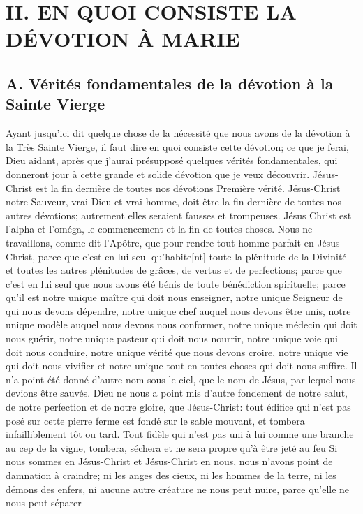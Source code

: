 \section{II. EN QUOI CONSISTE LA DÉVOTION À MARIE}
\subsection{A. Vérités fondamentales de la dévotion à la Sainte Vierge}
 Ayant jusqu'ici dit quelque chose de la nécessité que nous avons de la dévotion à la Très Sainte Vierge, il faut
dire en quoi consiste cette dévotion; ce que je ferai, Dieu aidant, après que j'aurai présupposé quelques vérités
fondamentales, qui donneront jour à cette grande et solide dévotion que je veux découvrir.
Jésus-Christ est la fin dernière de toutes nos dévotions
 Première vérité. Jésus-Christ notre Sauveur, vrai Dieu et vrai homme, doit être la fin dernière de toutes nos
autres dévotions; autrement elles seraient fausses et trompeuses. Jésus Christ est l'alpha et l'oméga, le
commencement et la fin de toutes choses. Nous ne travaillons, comme dit l'Apôtre, que pour rendre tout homme
parfait en Jésus-Christ, parce que c'est en lui seul qu'habite[nt] toute la plénitude de la Divinité et toutes les autres
plénitudes de grâces, de vertus et de perfections; parce que c'est en lui seul que nous avons été bénis de toute
bénédiction spirituelle; parce qu'il est notre unique maître qui doit nous enseigner, notre unique Seigneur de qui
nous devons dépendre, notre unique chef auquel nous devons être unis, notre unique modèle auquel nous devons
nous conformer, notre unique médecin qui doit nous guérir, notre unique pasteur qui doit nous nourrir, notre unique
voie qui doit nous conduire, notre unique vérité que nous devons croire, notre unique vie qui doit nous vivifier et
notre unique tout en toutes choses qui doit nous suffire. Il n'a point été donné d'autre nom sous le ciel, que le nom
de Jésus, par lequel nous devions être sauvés. Dieu ne nous a point mis d'autre fondement de notre salut, de
notre perfection et de notre gloire, que Jésus-Christ: tout édifice qui n'est pas posé sur cette pierre ferme est fondé
sur le sable mouvant, et tombera infailliblement tôt ou tard. Tout fidèle qui n'est pas uni à lui comme une branche
au cep de la vigne, tombera, séchera et ne sera propre qu'à être jeté au feu Si nous sommes en Jésus-Christ et
Jésus-Christ en nous, nous n'avons point de damnation à craindre; ni les anges des cieux, ni les hommes de la
terre, ni les démons des enfers, ni aucune autre créature ne nous peut nuire, parce qu'elle ne nous peut séparer
